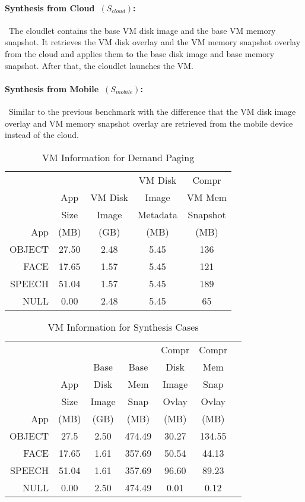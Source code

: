 \paragraph{Synthesis from Cloud~$(S_{cloud})$:}~The cloudlet contains the 
base VM disk image and the base VM memory snapshot. It retrieves the VM 
disk overlay and the VM memory snapshot overlay from the cloud and applies 
them to the base disk image and base memory snapshot. After that, the
cloudlet launches the VM.

\paragraph{Synthesis from Mobile~$(S_{mobile})$:}~Similar to the previous
benchmark with the difference that the VM disk image overlay and VM memory 
snapshot overlay are retrieved from the mobile device instead of the cloud.

\begin{table}
\centering
\begin{small}
\begin{tabular} {rcccc}
\hline\hline
&&&VM Disk&Compr\\
&App&VM Disk&Image&VM Mem\\
&Size&Image&Metadata&Snapshot\\
App&(MB)&(GB)&(MB)&(MB)\\ 
\hline
OBJECT&27.50&2.48&5.45&136\\
FACE&17.65&1.57&5.45&121\\
SPEECH&51.04&1.57&5.45&189\\
NULL&0.00&2.48&5.45&65\\
\hline
\end{tabular}
\end{small}
\caption{VM Information for Demand Paging}
\label{table:demandpagesizes}
\end{table}


\begin{table}
\centering
\begin{small}
\begin{tabular} {rcccccc}
\hline\hline
&&&&Compr&Compr\\
&&Base&Base&Disk&Mem\\
&App&Disk&Mem&Image&Snap\\
&Size&Image&Snap&Ovlay&Ovlay\\
App&(MB)&(GB)&(MB)&(MB)&(MB)\\
\hline
OBJECT&27.5&2.50&474.49&30.27&134.55 \\
FACE&17.65&1.61&357.69&50.54&44.13 \\
SPEECH&51.04&1.61&357.69&96.60&89.23 \\
NULL&0.00&2.50&474.49&0.01&0.12\\
\hline
\end{tabular}
\end{small}
\vspace{-0.1in}
\caption{VM Information for Synthesis Cases}
\label{table:synthesissizes}
\vspace{-0.2in}
\end {table}

